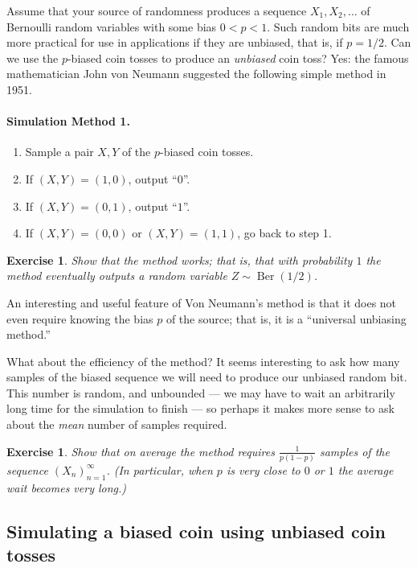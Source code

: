 \documentclass[12pt]{article}
\newtheorem{exercise}[thm]{Exercise}
\newcommand{\berdist}{\operatorname{Ber}}
\theoremstyle{example}
\begin{document}
Assume that your source of randomness produces a sequence $X_1, X_2, \ldots$ of Bernoulli random variables with some bias $0<p<1$. Such random bits are much more practical for use in applications if they are unbiased, that is, if $p=1/2$. Can we use the $p$-biased coin tosses to produce an \emph{unbiased} coin toss? Yes: the famous mathematician John von Neumann suggested the following simple method in 1951.

\paragraph{Simulation Method 1.} 
\begin{enumerate}
\item Sample a pair $X,Y$ of the $p$-biased coin tosses.
\item If $(X,Y)=(1,0)$, output ``$0$''. 
\item If $(X,Y)=(0,1)$, output ``$1$''.
\item If $(X,Y)=(0,0)$ or $(X,Y)=(1,1)$, go back to step 1.
\end{enumerate}

\begin{exercise} Show that the method works; that is, that with probability $1$ the method eventually outputs a random variable $Z \sim \berdist(1/2)$.
\end{exercise}

An interesting and useful feature of Von Neumann's method is that it does not even require knowing the bias $p$ of the source; that is, it is a ``universal unbiasing method.''

What about the efficiency of the method? It seems interesting to ask how many samples of the biased sequence we will need to produce our unbiased random bit. This number is random, and unbounded --- we may have to wait an arbitrarily long time for the simulation to finish --- so perhaps it makes more sense to ask about the \emph{mean} number of samples required.

\begin{exercise} Show that on average the method requires $\frac{1}{p(1-p)}$ samples of the sequence $(X_n)_{n=1}^\infty$. (In particular, when $p$ is very close to $0$ or $1$ the average wait becomes very long.)
\end{exercise}


\subsection{Simulating a biased coin using unbiased coin tosses}
\end{document}
